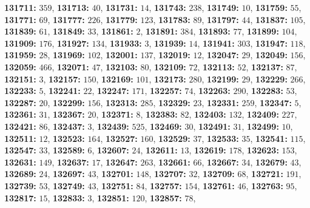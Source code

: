 \textsf{\bfseries 131711:} $359$, \textsf{\bfseries 131713:} $40$, \textsf{\bfseries 131731:} $14$, \textsf{\bfseries 131743:} $238$, \textsf{\bfseries 131749:} $10$, \textsf{\bfseries 131759:} $55$, \textsf{\bfseries 131771:} $69$, \textsf{\bfseries 131777:} $226$, \textsf{\bfseries 131779:} $123$, \textsf{\bfseries 131783:} $89$, \textsf{\bfseries 131797:} $44$, \textsf{\bfseries 131837:} $105$, \textsf{\bfseries 131839:} $61$, \textsf{\bfseries 131849:} $33$, \textsf{\bfseries 131861:} $2$, \textsf{\bfseries 131891:} $384$, \textsf{\bfseries 131893:} $77$, \textsf{\bfseries 131899:} $104$, \textsf{\bfseries 131909:} $176$, \textsf{\bfseries 131927:} $134$, \textsf{\bfseries 131933:} $3$, \textsf{\bfseries 131939:} $14$, \textsf{\bfseries 131941:} $303$, \textsf{\bfseries 131947:} $118$, \textsf{\bfseries 131959:} $28$, \textsf{\bfseries 131969:} $102$, \textsf{\bfseries 132001:} $137$, \textsf{\bfseries 132019:} $12$, \textsf{\bfseries 132047:} $29$, \textsf{\bfseries 132049:} $156$, \textsf{\bfseries 132059:} $466$, \textsf{\bfseries 132071:} $47$, \textsf{\bfseries 132103:} $80$, \textsf{\bfseries 132109:} $72$, \textsf{\bfseries 132113:} $52$, \textsf{\bfseries 132137:} $87$, \textsf{\bfseries 132151:} $3$, \textsf{\bfseries 132157:} $150$, \textsf{\bfseries 132169:} $101$, \textsf{\bfseries 132173:} $280$, \textsf{\bfseries 132199:} $29$, \textsf{\bfseries 132229:} $266$, \textsf{\bfseries 132233:} $5$, \textsf{\bfseries 132241:} $22$, \textsf{\bfseries 132247:} $171$, \textsf{\bfseries 132257:} $74$, \textsf{\bfseries 132263:} $290$, \textsf{\bfseries 132283:} $53$, \textsf{\bfseries 132287:} $20$, \textsf{\bfseries 132299:} $156$, \textsf{\bfseries 132313:} $285$, \textsf{\bfseries 132329:} $23$, \textsf{\bfseries 132331:} $259$, \textsf{\bfseries 132347:} $5$, \textsf{\bfseries 132361:} $31$, \textsf{\bfseries 132367:} $20$, \textsf{\bfseries 132371:} $8$, \textsf{\bfseries 132383:} $82$, \textsf{\bfseries 132403:} $132$, \textsf{\bfseries 132409:} $227$, \textsf{\bfseries 132421:} $86$, \textsf{\bfseries 132437:} $3$, \textsf{\bfseries 132439:} $525$, \textsf{\bfseries 132469:} $30$, \textsf{\bfseries 132491:} $31$, \textsf{\bfseries 132499:} $10$, \textsf{\bfseries 132511:} $12$, \textsf{\bfseries 132523:} $164$, \textsf{\bfseries 132527:} $160$, \textsf{\bfseries 132529:} $37$, \textsf{\bfseries 132533:} $35$, \textsf{\bfseries 132541:} $115$, \textsf{\bfseries 132547:} $33$, \textsf{\bfseries 132589:} $6$, \textsf{\bfseries 132607:} $24$, \textsf{\bfseries 132611:} $13$, \textsf{\bfseries 132619:} $178$, \textsf{\bfseries 132623:} $153$, \textsf{\bfseries 132631:} $149$, \textsf{\bfseries 132637:} $17$, \textsf{\bfseries 132647:} $263$, \textsf{\bfseries 132661:} $66$, \textsf{\bfseries 132667:} $34$, \textsf{\bfseries 132679:} $43$, \textsf{\bfseries 132689:} $24$, \textsf{\bfseries 132697:} $43$, \textsf{\bfseries 132701:} $148$, \textsf{\bfseries 132707:} $32$, \textsf{\bfseries 132709:} $68$, \textsf{\bfseries 132721:} $191$, \textsf{\bfseries 132739:} $53$, \textsf{\bfseries 132749:} $43$, \textsf{\bfseries 132751:} $84$, \textsf{\bfseries 132757:} $154$, \textsf{\bfseries 132761:} $46$, \textsf{\bfseries 132763:} $95$, \textsf{\bfseries 132817:} $15$, \textsf{\bfseries 132833:} $3$, \textsf{\bfseries 132851:} $120$, \textsf{\bfseries 132857:} $78$, 
